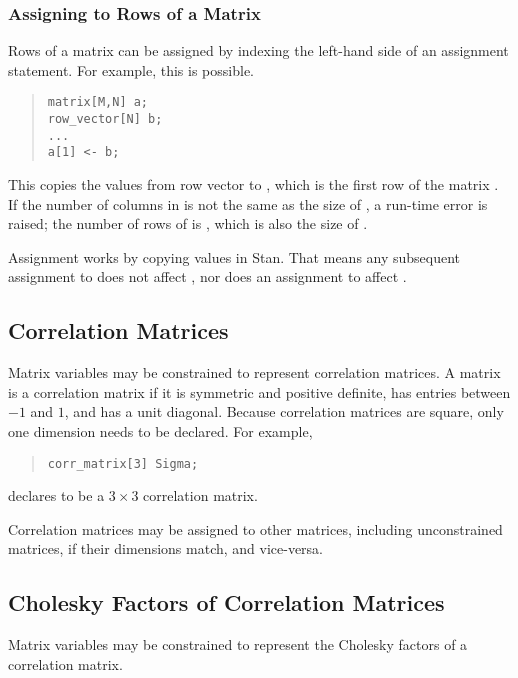 \subsubsection{Assigning to Rows of a Matrix}

Rows of a matrix can be assigned by indexing the left-hand side of an
assignment statement. For example, this is possible.
%
\begin{quote}
\begin{Verbatim}
matrix[M,N] a;
row_vector[N] b;
...
a[1] <- b;
\end{Verbatim}
\end{quote}
%
This copies the values from row vector  to , which
is the first row of the matrix .  If the number of columns in
 is not the same as the size of , a run-time error is
raised;  the number of rows of  is , which is also the
size of .

Assignment works by copying values in Stan.  That means any subsequent
assignment to  does not affect , nor does an
assignment to  affect .


\subsection{Correlation Matrices}

Matrix variables may be constrained to represent correlation matrices.
A matrix is a correlation matrix if it is symmetric and positive
definite, has entries between $-1$ and $1$, and has a unit diagonal.
Because correlation matrices are square, only one dimension needs
to be declared.  For example,
%
\begin{quote}
\begin{Verbatim} 
corr_matrix[3] Sigma;
\end{Verbatim}
\end{quote}
% 
declares  to be a $3 \times 3$ correlation matrix.

Correlation matrices may be assigned to other matrices, including
unconstrained matrices, if their dimensions match, and vice-versa.

\subsection{Cholesky Factors of Correlation Matrices}

Matrix variables may be constrained to represent the Cholesky factors
of a correlation matrix.  

